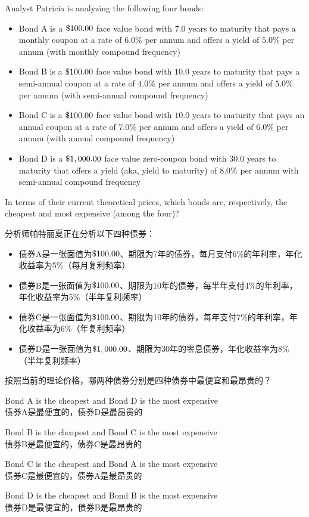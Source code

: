 \documentclass{article}
\newcommand{\dollar}{\ifmmode\text{\$}\else\$\fi}  %
\newcounter{question} %
\begin{document}
\begin{question}
    Analyst Patricia is analyzing the following four bonds:
    \begin{itemize}
        \item Bond A is a $\dollar100.00$ face value bond with $7.0$ years to maturity that pays a monthly coupon at a rate of $6.0\%$ per annum and offers a yield of $5.0\%$ per annum (with monthly compound frequency)
        \item Bond B is a $\dollar100.00$ face value bond with $10.0$ years to maturity that pays a semi-annual coupon at a rate of $4.0\%$ per annum and offers a yield of $5.0\%$ per annum (with semi-annual compound frequency)
        \item Bond C is a $\dollar100.00$ face value bond with $10.0$ years to maturity that pays an annual coupon at a rate of $7.0\%$ per annum and offers a yield of $6.0\%$ per annum (with annual compound frequency)
        \item Bond D is a $\dollar1,000.00$ face value zero-coupon bond with $30.0$ years to maturity that offers a yield (aka, yield to maturity) of $8.0\%$ per annum with semi-annual compound frequency
    \end{itemize}
    In terms of their current theoretical prices, which bonds are, respectively, the cheapest and most expensive (among the four)?

    分析师帕特丽夏正在分析以下四种债券：
    \begin{itemize}
        \item 债券A是一张面值为$\dollar100.00$、期限为7年的债券，每月支付6\%的年利率，年化收益率为5\%（每月复利频率）
        \item 债券B是一张面值为$\dollar100.00$、期限为10年的债券，每半年支付4\%的年利率，年化收益率为5\%（半年复利频率）
        \item 债券C是一张面值为$\dollar100.00$、期限为10年的债券，每年支付7\%的年利率，年化收益率为6\%（年复利频率）
        \item 债券D是一张面值为$\dollar1,000.00$、期限为30年的零息债券，年化收益率为8\%（半年复利频率）
    \end{itemize}
    按照当前的理论价格，哪两种债券分别是四种债券中最便宜和最昂贵的？
\end{question}

\begin{choices}
    \item Bond A is the cheapest and Bond D is the most expensive
    \\债券A是最便宜的，债券D是最昂贵的
    \item Bond B is the cheapest and Bond C is the most expensive
    \\债券B是最便宜的，债券C是最昂贵的
    \item Bond C is the cheapest and Bond A is the most expensive
    \\债券C是最便宜的，债券A是最昂贵的
    \item Bond D is the cheapest and Bond B is the most expensive
    \\债券D是最便宜的，债券B是最昂贵的
\end{choices}
\end{document}
